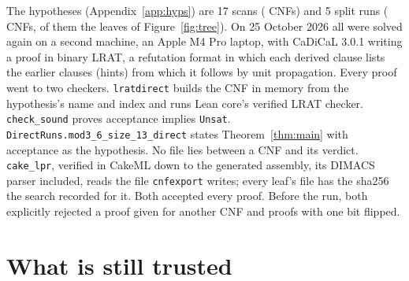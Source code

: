 \documentclass[11pt]{article}
\newcommand{\lean}[1]{\texttt{#1}}
\begin{document}
The hypotheses (Appendix~\ref{app:hyps}) are 17 scans (\NScanCNFs{} CNFs) and 5 split runs (\NLeafCNFs{} CNFs,
\NTreeLeaves{} of them the leaves of Figure~\ref{fig:tree}). On 25 October 2026 all \NAllCNFs{} were solved again
on a second machine, an Apple M4 Pro laptop, with CaDiCaL 3.0.1 writing a proof in binary LRAT, a refutation format in which each
derived clause lists the earlier clauses (hints) from which it follows by unit propagation. Every proof went to
two checkers. \lean{lratdirect} builds the CNF in memory from the hypothesis's name and index and runs Lean core's verified LRAT checker.
\lean{check\_sound} proves acceptance implies \lean{Unsat}. \lean{DirectRuns.mod3\_6\_size\_13\_direct} states
Theorem~\ref{thm:main} with acceptance as the hypothesis. No file lies between a CNF and its verdict.
\lean{cake\_lpr}, verified in CakeML down to the generated assembly, its DIMACS parser included, reads the file
\lean{cnfexport} writes; every leaf's file has the sha256 the search recorded for it. Both accepted every proof. Before the run, both
explicitly rejected a proof given for another CNF and proofs with one bit flipped.

\section{What is still trusted}\label{sec:trusted}
\end{document}
